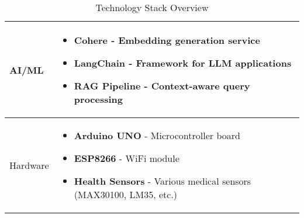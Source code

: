 \begin{table}[H]
\begin{tabularx}{\textwidth}{|>{\raggedright\arraybackslash}p{4.5cm}|X|}
\hline
AI/ML & 
\begin{itemize}[nosep,leftmargin=*,after=\vspace{-\baselineskip}]
    \item \textbf{Cohere} - Embedding generation service
    \item \textbf{LangChain} - Framework for LLM applications
    \item \textbf{RAG Pipeline} - Context-aware query processing
\end{itemize} \\
\hline
Hardware & 
\begin{itemize}[nosep,leftmargin=*,after=\vspace{-\baselineskip}]
    \item \textbf{Arduino UNO} - Microcontroller board
    \item \textbf{ESP8266} - WiFi module
    \item \textbf{Health Sensors} - Various medical sensors (MAX30100, LM35, etc.)
\end{itemize} \\
\hline
\end{tabularx}
\caption{Technology Stack Overview}
\end{table}

\endgroup 